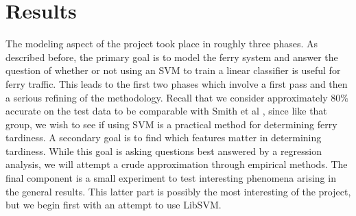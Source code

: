 \documentclass[11pt]{article} %
\begin{document}
% 
% 
% 
% 

% 
% 

\section{Results}
\label{sec:results}
The modeling aspect of the project took place in roughly three phases. As 
described before, the primary goal is to model the ferry system and answer the 
question of whether or not using an SVM to train a linear classifier is useful 
for ferry traffic. This leads to the first two phases
which involve a first pass and then a serious refining of the methodology.  Recall 
that we consider approximately $80\%$ accurate on the test data to be comparable
with Smith et al \cite{smith2008decision}, since like that group, we wish to see
if using SVM is a practical method for determining ferry tardiness. 
A secondary goal is to find which features matter in determining tardiness.  While
this goal is asking questions best answered by a regression analysis, we will 
attempt a crude approximation through empirical methods.  The final component is 
a small experiment to test interesting phenomena arising in the general results.  
This latter part is possibly the most interesting of the project, but we begin 
first with an attempt to use LibSVM.
\end{document}
